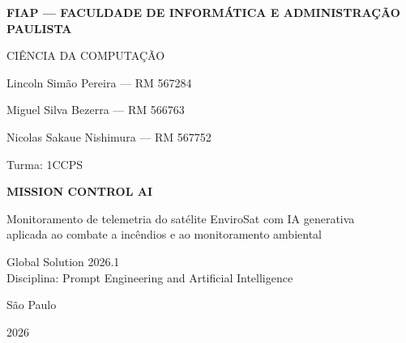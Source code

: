 \documentclass[12pt,a4paper]{article}
\begin{document}
\begin{titlepage}
\begin{center}
{\large\bfseries FIAP --- FACULDADE DE INFORMÁTICA E ADMINISTRAÇÃO PAULISTA\par}
{\large CIÊNCIA DA COMPUTAÇÃO\par}
\vspace{1cm}
{\normalsize Lincoln Simão Pereira --- RM 567284\par}
{\normalsize Miguel Silva Bezerra --- RM 566763\par}
{\normalsize Nicolas Sakaue Nishimura --- RM 567752\par}
{\normalsize Turma: 1CCPS\par}
\vfill
{\LARGE\bfseries MISSION CONTROL AI\par}
\vspace{0.4cm}
{\large Monitoramento de telemetria do satélite EnviroSat com IA generativa\\ aplicada ao combate a incêndios e ao monitoramento ambiental\par}
\vfill
{\normalsize Global Solution 2026.1\\ Disciplina: Prompt Engineering and Artificial Intelligence\par}
\vspace{2cm}
{\normalsize São Paulo\par}
{\normalsize 2026\par}
\end{center}
\end{titlepage}
\end{document}
